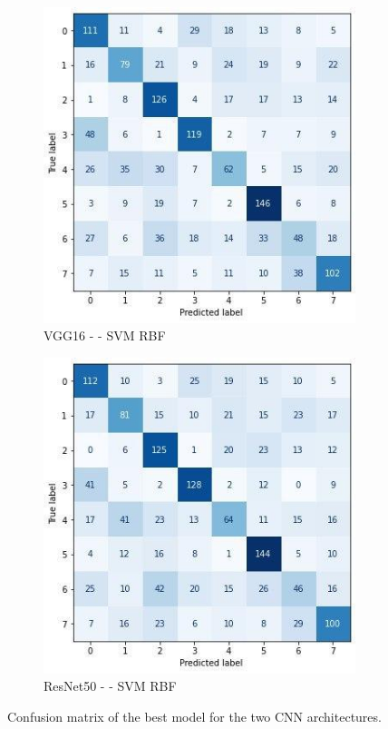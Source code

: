 \begin{figure}[ht]
  \begin{subfigure}[c]{0.475\textwidth}
    \centering
    \includegraphics[width=\textwidth]{images/best_vgg16_svmrbf.jpg}
    \caption{VGG16 -  - SVM RBF}
    \label{fig:best_vgg16_svmrbf_cm}
  \end{subfigure}
  \hfill
  \begin{subfigure}[c]{0.475\textwidth}
    \centering
    \includegraphics[width=\textwidth]{images/best_resnet50_svmrbf.jpg}
    \caption{ResNet50 -  - SVM RBF}
    \label{fig:best_resnet50_svmrbf_cm}
  \end{subfigure}
  \caption{Confusion matrix of the best model for the two CNN architectures.}
\end{figure}

